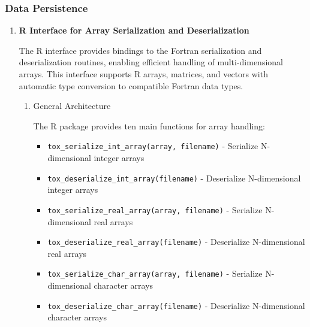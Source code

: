 \subsubsection{Data Persistence}
\begin{enumerate}
    \item \textbf{R Interface for Array Serialization and Deserialization}
          
          The R interface provides bindings to the Fortran serialization and deserialization
          routines, enabling efficient handling of multi-dimensional arrays. This interface
          supports R arrays, matrices, and vectors with automatic type conversion to
          compatible Fortran data types.
          \begin{enumerate}
            \item {General Architecture}
                  
                  The R package provides ten main functions for array handling:
                  
                  \begin{itemize}
                    \item \texttt{tox\_serialize\_int\_array(array, filename)} -
                          Serialize N-dimensional integer arrays
                          
                    \item \texttt{tox\_deserialize\_int\_array(filename)} - Deserialize
                          N-dimensional integer arrays
                          
                    \item \texttt{tox\_serialize\_real\_array(array, filename)} -
                          Serialize N-dimensional real arrays
                          
                    \item \texttt{tox\_deserialize\_real\_array(filename)} - Deserialize
                          N-dimensional real arrays
                          
                    \item \texttt{tox\_serialize\_char\_array(array, filename)} -
                          Serialize N-dimensional character arrays
                          
                    \item \texttt{tox\_deserialize\_char\_array(filename)} - Deserialize
                          N-dimensional character arrays
                          

\end{itemize}
\end{enumerate}
\end{enumerate}
